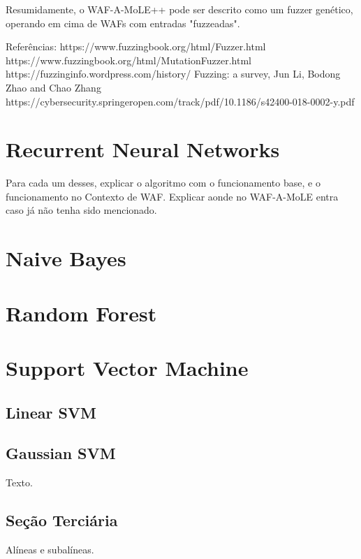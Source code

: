 Resumidamente, o WAF-A-MoLE++ pode ser descrito como um fuzzer genético, operando em cima de WAFs com entradas "fuzzeadas".

Referências:
https://www.fuzzingbook.org/html/Fuzzer.html
https://www.fuzzingbook.org/html/MutationFuzzer.html
https://fuzzinginfo.wordpress.com/history/
Fuzzing: a survey, Jun Li, Bodong Zhao and Chao Zhang
https://cybersecurity.springeropen.com/track/pdf/10.1186/s42400-018-0002-y.pdf

\section{Recurrent Neural Networks}

Para cada um desses, explicar o algoritmo com o funcionamento base, e o funcionamento no Contexto de WAF. Explicar aonde no WAF-A-MoLE entra caso já não tenha sido mencionado. 

\section{Naive Bayes}

\section{Random Forest}

\section{Support Vector Machine}

\subsection{Linear SVM}

\subsection{Gaussian SVM}






Texto.

\subsection{Seção Terciária}

Alíneas e subalíneas.
\bigskip

